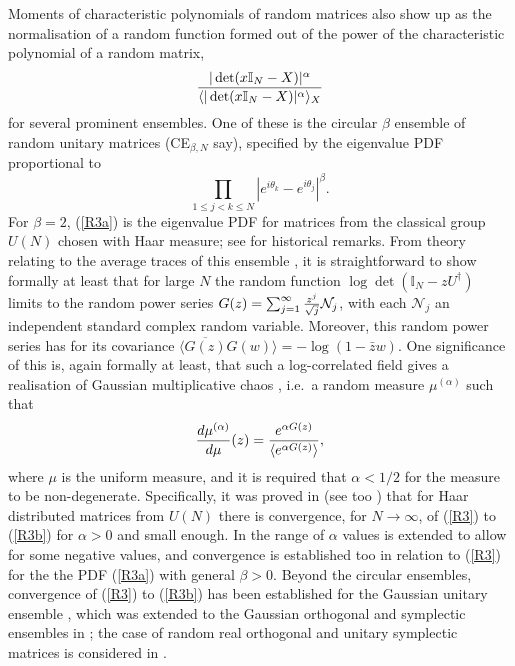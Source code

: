 \documentclass[11pt,a4paper]{article}
\numberwithin{equation}{section} %
\theoremstyle{plain}
\theoremstyle{definition}
\numberwithin{prop}{section}
\numberwithin{cor}{section}
\numberwithin{remark}{section}
\begin{document}
Moments of characteristic polynomials of random matrices also show up as the normalisation of a random function
formed out of the power of the characteristic polynomial of a random matrix,
\begin{equation}\label{R3}
{|\det (x \mathbb I_N - X) |^\alpha \over \langle |\det (x \mathbb I_N - X) |^\alpha  \rangle_X}
  \end{equation}  
  for several prominent ensembles. One of these is the circular $\beta$ ensemble of random unitary matrices
  (CE${}_{\beta,N}$ say),
  specified by the eigenvalue PDF proportional to
 \begin{equation}\label{R3a} 
 \prod_{1 \le j < k \le N} | e^{i \theta_k} - e^{i \theta_j} |^\beta.
   \end{equation}  
   For $\beta = 2$, (\ref{R3a}) is the eigenvalue PDF for matrices from the classical group $U(N)$ chosen with Haar
   measure; see \cite{DF17} for historical remarks. From theory relating to the average traces of this ensemble
   \cite{DS94,HKO01}, it is straightforward to show formally at least that for large $N$ the random function
   $\log \det (\mathbb I_N - z U^\dagger)$ limits to the random power series $G(z) = \sum_{j=1}^\infty {z^j \over \sqrt{j}} \mathcal N_j$, with
   each $\mathcal N_j$ an independent standard complex random variable. Moreover, this random power series has for
   its covariance $\langle \overline{G(z)} G(w) \rangle = - \log (1 - \bar{z} w)$. One significance of this is, again formally
   at least, that such a log-correlated field gives a realisation of Gaussian multiplicative chaos \cite{Ka85},
   i.e.~a random measure $\mu^{(\alpha)}$ such that
    \begin{equation}\label{R3b} 
    {d \mu^{(\alpha)} \over d \mu}(z) = {e^{\alpha G(z)} \over \langle e^{\alpha G(z)} \rangle},
     \end{equation}  
     where $\mu$ is the uniform measure, and it is required that $\alpha < 1/2 $ for the measure to be non-degenerate.
     Specifically, it was  proved in \cite{We15} (see too \cite{NSW20,BF22}) that for Haar distributed matrices from $U(N)$ there is convergence,
     for $N \to \infty$, of (\ref{R3}) to (\ref{R3b}) for $\alpha>0$ and small enough. In \cite{LN24} the range of $\alpha$ values is extended
     to allow for some negative values, and convergence is established too in relation to (\ref{R3}) for the the PDF (\ref{R3a}) with
     general $\beta > 0$. Beyond the circular ensembles, convergence of (\ref{R3}) to (\ref{R3b}) has been established for
     the Gaussian unitary ensemble \cite{BWW18}, which was extended to the Gaussian orthogonal and symplectic ensembles
     in \cite{Ki24}; the case of random real orthogonal and unitary symplectic matrices is considered in \cite{FK21}.
     
\end{document}
